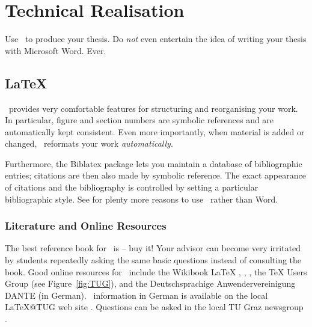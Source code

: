 %
%
% 
% 
% 


\chapter{Technical Realisation}

\label{chap:Tech}


Use \LaTeXe\ to produce your thesis. Do \emph{not} even entertain the
idea of writing your thesis with Microsoft Word. Ever.



\section{LaTeX}

\LaTeXe\ provides very comfortable features for structuring and
reorganising your work. In particular, figure and section numbers are
symbolic references and are automatically kept consistent. Even more
importantly, when material is added or changed, \LaTeXe\ reformats
your work \emph{automatically}.

Furthermore, the Biblatex package lets you maintain a database of
bibliographic entries; citations are then also made by symbolic
reference. The exact appearance of citations and the bibliography is
controlled by setting a particular bibliographic style.
See \citet{WordProcessors} for plenty more reasons to use \LaTeXe\
rather than Word.



\subsection{Literature and Online Resources}

The best reference book for \LaTeXe\ is \citet{KopkaDaly} -- buy it!
Your advisor can become very irritated by students repeatedly asking
the same basic questions instead of consulting the book.
%
Good online resources for \LaTeXe\ include the Wikibook LaTeX
\citep{Wikibooks-latex}, \citet{NotShortIntroLaTeX},
\citet{FormattingInformation}, the TeX Users Group \citep{TUG} (see
Figure~\ref{fig:TUG}), and the Deutschsprachige Anwendervereinigung
DANTE \citep{DANTE} (in German).
%
\LaTeXe\ information in German is available on the local LaTeX@TUG web
site \citep{LatexTUGraz}. Questions can be asked in the local TU Graz
newsgroup \news{tu-graz.latex}.



